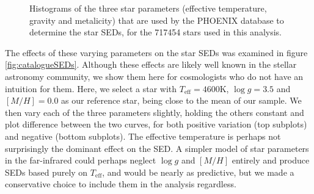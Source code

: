 \documentclass{aa}
\begin{document}
\begin{figure}
  \caption{Histograms of the three star parameters (effective temperature, gravity and metalicity) that are used by the PHOENIX database to determine the star SEDs, for the 717454 stars used in this analysis.}
  \label{fig:gaiacat}
\end{figure}

The effects of these varying parameters on the star SEDs was examined in figure \ref{fig:catalogueSEDs}. Although these effects are likely well known in the stellar astronomy community, we show them here for cosmologists who do not have an intuition for them. Here, we select a star with $T_{\mathrm{eff}}= 4600$K, $\log g = 3.5$ and $[M/H]= 0.0$ as our reference star, being close to the mean of our sample. We then vary each of the three parameters slightly, holding the others constant and plot difference between the two curves, for both positive variation (top subplots) and negative (bottom subplots). The effective temperature is perhaps not surprisingly the dominant effect on the SED. A simpler model of star parameters in the far-infrared could perhaps neglect $\log g$ and $[M/H]$ entirely and produce SEDs based purely on $T_{\mathrm{eff}}$, and would be nearly as predictive, but we made a conservative choice to include them in the analysis regardless. 
\end{document}
